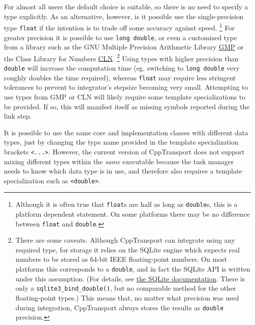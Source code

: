 \documentclass[11pt,a4paper]{article}
\newcounter{advancedbox}[section]
\newenvironment{advanced}[1]{\stepcounter{advancedbox}\begin{tcolorbox}[enhanced,breakable,colback=red!10,colbacktitle=red!20,colframe=red!40,coltitle=black,title={Advanced usage: {#1}},fonttitle=\sffamily\fontseries{b}\selectfont]}{\end{tcolorbox}}
\newcommand{\packagefont}{\sffamily}
\newcommand{\CppTransport}{{\packagefont CppTransport}}
\newcommand{\SQLite}{{\packagefont SQLite}}
\begin{document}
\begin{advanced}{Custom integration data types}
    For almost all users the default choice is suitable,
    so there is no need to specify a type explicitly.
    As an alternative, however, is it possible use the single-precision type
    \texttt{float}
    if the intention is to trade off some accuracy against speed.%
        \footnote{Although it is often true that
        \texttt{float}s are half as long as
        \texttt{double}s, this is a platform dependent statement.
        On some platforms there may be no difference between
        \texttt{float} and \texttt{double}.}
    For greater precision it is possible to use
    \texttt{long double},
    or even a customized type
    from a library such as the GNU Multiple Precision Arithmetic Library
    \href{https://gmplib.org}{GMP}
    or the Class Library for Numbers \href{http://www.ginac.de/CLN}{CLN}.%
        \footnote{There are some caveats. Although {\CppTransport} can integrate
        using any required type, for storage it relies on the
        {\SQLite} engine which expects real numbers to be stored as
        64-bit IEEE floating-point numbers.
        On most platforms this corresponds to a \texttt{double},
        and in fact the {\SQLite} API
        is written under this assumption.
        (For details, see
        \href{https://www.sqlite.org/c3ref/bind_blob.html}{the {\SQLite}
        documentation}.
        There is only a
        \texttt{sqlite3_bind_double()}, but no
        comparable method for the other floating-point types.)
        This means that, no matter what precision was used during integration,
        {\CppTransport} always stores the results
        as \texttt{double} precision.}
    Using types with higher precision than \texttt{double} will
    increase the computation time
    (eg. switching to \texttt{long double}
    very roughly doubles the time required),
    whereas
    \texttt{float} may require less stringent tolerances
    to prevent to integrator's stepsize becoming very small.
    Attempting to use types from GMP or CLN will likely require some
    template specializations to be provided. If so, this will manifest itself
    as missing symbols reported during the link step.
    
    It is possible to use the same core and implementation classes with
    different data types, just by changing the type name provided
    in the template specialization brackets
    \texttt{<...>}.
    However, the current version of {\CppTransport} does not support mixing different
    types within the \emph{same} executable because the task manager
    needs to know which data type is in use, and therefore also requires
    a template specialization such as
    \texttt{<double>}.
\end{advanced}
\end{document}
